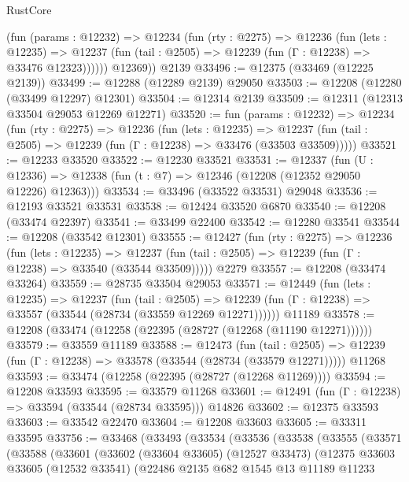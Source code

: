 \begin{lexlean}{RustCore}
\begin{coremodule}
          (fun (params : @12232) =>
          @12234
            (fun (rty : @2275) =>
            @12236
              (fun (lets : @12235) =>
              @12237 (fun (tail : @2505) => @12239 (fun (Γ : @12238) => @33476 @12323))))))
        @12369))
    @2139
@33496 := @12375 (@33469 (@12225 @2139))
@33499 := @12288 (@12289 @2139) @29050
@33503 := @12208 (@12280 (@33499 @12297) @12301)
@33504 := @12314 @2139
@33509 := @12311 (@12313 @33504 @29053 @12269 @12271)
@33520 := fun (params : @12232) =>
  @12234
    (fun (rty : @2275) =>
    @12236
      (fun (lets : @12235) =>
      @12237 (fun (tail : @2505) => @12239 (fun (Γ : @12238) => @33476 (@33503 @33509)))))
@33521 := @12233 @33520
@33522 := @12230 @33521
@33531 := @12337
    (fun (U : @12336) => @12338 (fun (t : @7) => @12346 (@12208 (@12352 @29050 @12226) @12363)))
@33534 := @33496 (@33522 @33531) @29048
@33536 := @12193 @33521 @33531
@33538 := @12424 @33520 @6870
@33540 := @12208 (@33474 @22397)
@33541 := @33499 @22400
@33542 := @12280 @33541
@33544 := @12208 (@33542 @12301)
@33555 := @12427
    (fun (rty : @2275) =>
    @12236
      (fun (lets : @12235) =>
      @12237 (fun (tail : @2505) => @12239 (fun (Γ : @12238) => @33540 (@33544 @33509)))))
    @2279
@33557 := @12208 (@33474 @33264)
@33559 := @28735 @33504 @29053
@33571 := @12449
    (fun (lets : @12235) =>
    @12237
      (fun (tail : @2505) =>
      @12239 (fun (Γ : @12238) => @33557 (@33544 (@28734 (@33559 @12269 @12271))))))
    @11189
@33578 := @12208 (@33474 (@12258 (@22395 (@28727 (@12268 (@11190 @12271))))))
@33579 := @33559 @11189
@33588 := @12473
    (fun (tail : @2505) => @12239 (fun (Γ : @12238) => @33578 (@33544 (@28734 (@33579 @12271)))))
    @11268
@33593 := @33474 (@12258 (@22395 (@28727 (@12268 @11269))))
@33594 := @12208 @33593
@33595 := @33579 @11268
@33601 := @12491 (fun (Γ : @12238) => @33594 (@33544 (@28734 @33595))) @14826
@33602 := @12375 @33593
@33603 := @33542 @22470
@33604 := @12208 @33603
@33605 := @33311 @33595
@33756 := @33468
    (@33493
      (@33534
        (@33536
          (@33538
            (@33555
              (@33571
                (@33588
                  (@33601
                    (@33602
                      (@33604 @33605)
                      (@12527 @33473)
                      (@12375
                        @33603
                        @33605
                        (@12532 @33541)
                        (@22486
                          @2135
                          @682
                          @1545
                          @13
                          @11189
                          @11233

\end{coremodule}
\end{lexlean}
